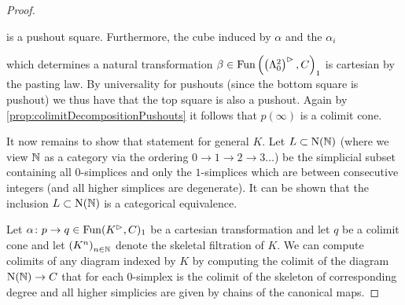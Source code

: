 \begin{lemma}
\begin{proof}
\begin{center}
        \end{center}
        is a pushout square.
        Furthermore, the cube induced by $\alpha$ and the $\alpha_i$
        \begin{center}
        \end{center}
        which determines a natural transformation $\beta\in\operatorname{Fun}\left(\left(\Lambda_0^2\right)^{\rhd},C\right)_1$ is cartesian by the pasting law.
        By universality for pushouts (since the bottom square is pushout) we thus have that the top square is also a pushout.
        Again by \cref{prop:colimitDecompositionPushouts} it follows that $p(\infty)$ is a colimit cone.

        It now remains to show that statement for general $K$.
        Let $L\subset\operatorname{N}(\mathbb{N})$ (where we view $\mathbb{N}$ as a category via the ordering $0\to1\to2\to3\ldots$) be the simplicial subset containing all $0$-simplices and only the $1$-simplices which are between consecutive integers (and all higher simplices are degenerate).
        It can be shown that the inclusion $L\subset\operatorname{N}(\mathbb{N})$ is a categorical equivalence. %

        Let $\alpha\colon p\to q\in\operatorname{Fun}(K^{\rhd},C)_1$ be a cartesian transformation and let $q$ be a colimit cone and let $\left(K^n\right)_{n\in\mathbb{N}}$ denote the skeletal filtration of $K$.
        We can compute colimits of any diagram indexed by $K$ by computing the colimit of the diagram $\operatorname{N}(\mathbb{N})\to C$ that for each $0$-simplex is the colimit of the skeleton of corresponding degree and all higher simplicies are given by chains of the canonical maps. 


\end{proof}
\end{lemma}
